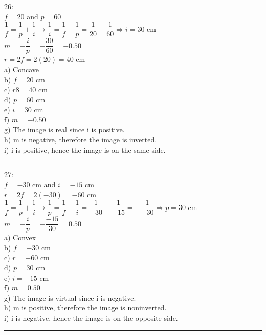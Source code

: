 \documentclass[fleqn]{article}
\begin{document}
\begin{enumerate}
    \textcolor{hwColor}{
      26: \\
      $f=20$ and $p=60$ \\
      $\dfrac{1}{f}=\dfrac{1}{p}+\dfrac{1}{i} \rightarrow \dfrac{1}{i}=\dfrac{1}{f}-\dfrac{1}{p}=\dfrac{1}{20}-\dfrac{1}{60} \Longrightarrow i=30$ cm \\
      $m=-\dfrac{i}{p}=-\dfrac{30}{60}=-0.50$ \\
      $r=2f=2(20)=40$ cm \\
      a) Concave \\
      b) $f=20$ cm \\
      c) $r8=40$ cm \\
      d) $p=60$ cm \\
      e) $i=30$ cm \\
      f) $m=-0.50$ \\
      g) The image is real since i is positive. \\
      h) m is negative, therefore the image is inverted. \\
      i) i is positive, hence the image is on the same side. \\
    }

    \textcolor{hwColor}{
      \rule{15cm}{0.4pt}
    }

    \textcolor{hwColor}{
      27: \\
      $f=-30$ cm and $i=-15$ cm \\
      $r=2f=2(-30)=-60$ cm \\
      $\dfrac{1}{f}=\dfrac{1}{p}+\dfrac{1}{i} \rightarrow \dfrac{1}{p}=\dfrac{1}{f}-\dfrac{1}{i}=\dfrac{1}{-30}-\dfrac{1}{-15}=-\dfrac{1}{-30} \Longrightarrow p=30$ cm \\
      $m=-\dfrac{i}{p}=-\dfrac{-15}{30}=0.50$ \\
      a) Convex \\
      b) $f=-30$ cm \\
      c) $r=-60$ cm \\
      d) $p=30$ cm \\
      e) $i=-15$ cm \\
      f) $m=0.50$ \\
      g) The image is virtual since i is negative. \\
      h) m is positive, therefore the image is noninverted. \\
      i) i is negative, hence the image is on the opposite side. \\
    }

    \textcolor{hwColor}{
      \rule{15cm}{0.4pt}
    }


\end{enumerate}
\end{document}
